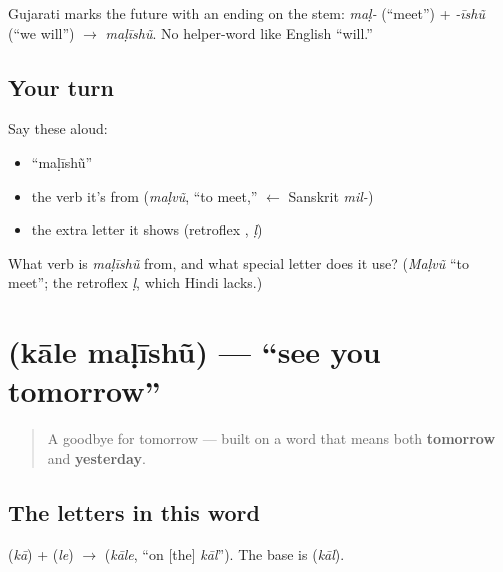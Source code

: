 \begin{grammarlens}[title={Grammar Lens: the future is an ending}]
Gujarati marks the future with an ending on the stem: \emph{maḷ-} (\textquotedblleft{}meet\textquotedblright{}) + \emph{-īshũ} (\textquotedblleft{}we will\textquotedblright{}) $\to$ \emph{maḷīshũ}. No helper-word like English \textquotedblleft{}will.\textquotedblright{}
\end{grammarlens}

\subsection*{Your turn}
Say these aloud:

\begin{itemize}
\raggedright
  \item \textquotedblleft{}maḷīshũ\textquotedblright{}
  \item the verb it's from (\emph{maḷvũ}, \textquotedblleft{}to meet,\textquotedblright{} $\leftarrow$ Sanskrit \emph{mil-})
  \item the extra letter it shows (retroflex , \emph{ḷ})
\end{itemize}

\begin{tcolorbox}[breakable,colback=teal!4,colframe=teal!35!black,title={Before you move on}]
What verb is \emph{maḷīshũ} from, and what special letter does it use? (\emph{Maḷvũ} \textquotedblleft{}to meet\textquotedblright{}; the retroflex  \emph{ḷ}, which Hindi lacks.)
\end{tcolorbox}
\section[\texorpdfstring{\gu{કાલે} \gu{મળીશું} (kāle maḷīshũ)}{કાલે મળીશું (kāle maḷīshũ)}]{  (kāle maḷīshũ) — \textquotedblleft{}see you tomorrow\textquotedblright{}}

\label{lesson:GU-C04-kaale}



\begin{quote}
A goodbye for tomorrow — built on a word that means both \textbf{tomorrow} and \textbf{yesterday}.
\end{quote}

\subsection*{The letters in this word}
\textbf{} (\emph{kā}) + \textbf{} (\emph{le}) $\to$ \textbf{} (\emph{kāle}, \textquotedblleft{}on {[}the{]} \emph{kāl}\textquotedblright{}). The base is \textbf{} (\emph{kāl}).


